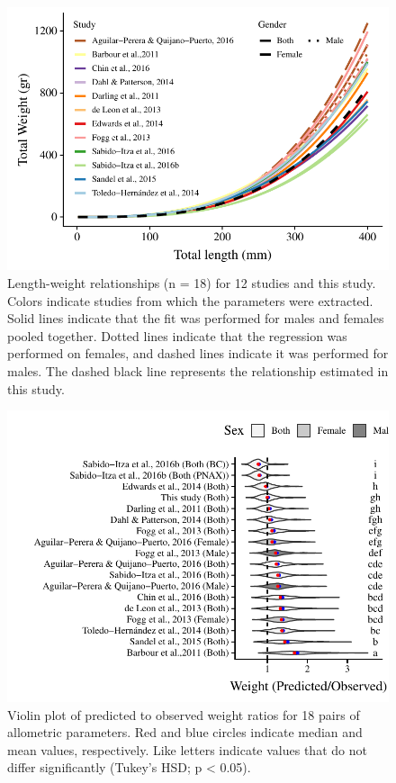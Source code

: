 \documentclass[fleqn,10pt,lineno]{wlpeerj} %
\begin{document}
\begin{figure}
\centering
\includegraphics{Manuscript_files/figure-latex/unnamed-chunk-6-1.pdf}
\caption{\label{fig:all_allo}Length-weight relationships (n = 18) for 12
studies and this study. Colors indicate studies from which the
parameters were extracted. Solid lines indicate that the fit was
performed for males and females pooled together. Dotted lines indicate
that the regression was performed on females, and dashed lines indicate
it was performed for males. The dashed black line represents the
relationship estimated in this study.}
\end{figure}

\begin{figure}
\centering
\includegraphics{Manuscript_files/figure-latex/unnamed-chunk-7-1.pdf}
\caption{\label{fig:bio_ratio}Violin plot of predicted to observed
weight ratios for 18 pairs of allometric parameters. Red and blue
circles indicate median and mean values, respectively. Like letters
indicate values that do not differ significantly (Tukey's HSD; p
\textless{} 0.05).}
\end{figure}
\end{document}

